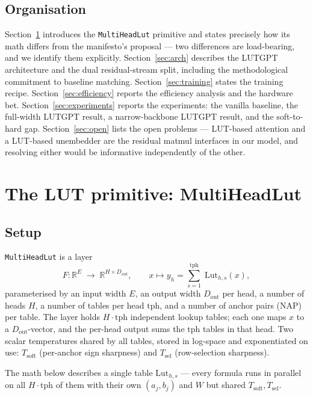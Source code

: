 \documentclass[11pt]{article}
\newcommand{\R}{\mathbb{R}}
\newcommand{\Tsel}{T_{\mathrm{sel}}}
\newcommand{\Tsoft}{T_{\mathrm{soft}}}
\newcommand{\dout}{D_{\mathrm{out}}}
\begin{document}
\subsection{Organisation}

Section~\ref{sec:primitive} introduces the \texttt{MultiHeadLut} primitive and states precisely how its math differs from the manifesto's proposal --- two differences are load-bearing, and we identify them explicitly. Section~\ref{sec:arch} describes the LUTGPT architecture and the dual residual-stream split, including the methodological commitment to baseline matching. Section~\ref{sec:training} states the training recipe. Section~\ref{sec:efficiency} reports the efficiency analysis and the hardware bet. Section~\ref{sec:experiments} reports the experiments: the vanilla baseline, the full-width LUTGPT result, a narrow-backbone LUTGPT result, and the soft-to-hard gap. Section~\ref{sec:open} lists the open problems --- LUT-based attention and a LUT-based unembedder are the residual matmul interfaces in our model, and resolving either would be informative independently of the other.

\section{The LUT primitive: MultiHeadLut}
\label{sec:primitive}

\subsection{Setup}
\label{ssec:setup}

\texttt{MultiHeadLut} is a layer
\[
F : \R^{E} \;\to\; \R^{H \times \dout},
\qquad x \mapsto y_h = \sum_{s=1}^{\text{tph}}\; \text{Lut}_{h,s}(x),
\]
parameterised by an input width $E$, an output width $\dout$ per head, a number of heads $H$, a number of tables per head $\mathrm{tph}$, and a number of anchor pairs (NAP) per table. The layer holds $H \cdot \mathrm{tph}$ independent lookup tables; each one maps $x$ to a $\dout$-vector, and the per-head output sums the $\mathrm{tph}$ tables in that head. Two scalar temperatures shared by all tables, stored in log-space and exponentiated on use: $\Tsoft$ (per-anchor sign sharpness) and $\Tsel$ (row-selection sharpness).

The math below describes a single table $\mathrm{Lut}_{h,s}$ --- every formula runs in parallel on all $H \cdot \mathrm{tph}$ of them with their own $(a_j, b_j)$ and $W$ but shared $\Tsoft, \Tsel$.
\end{document}
